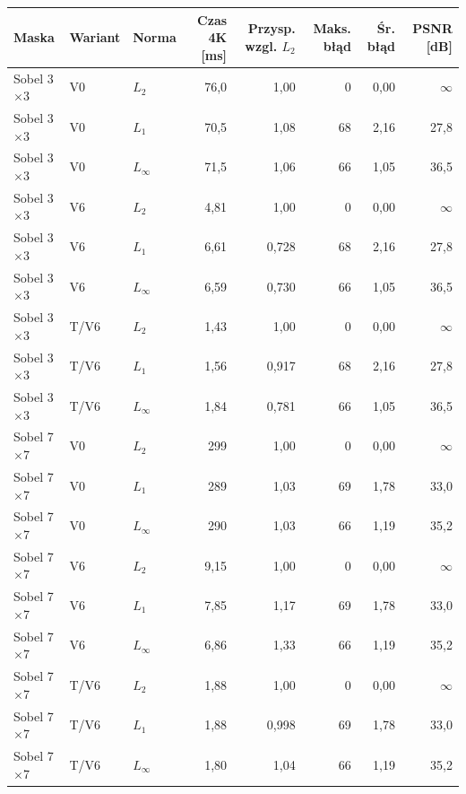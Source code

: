 \begin{tabular}{lllrrrrr}
\toprule
Maska & Wariant & Norma & Czas 4K [ms] & Przysp. wzgl. $L_2$ & Maks. błąd & Śr. błąd & PSNR [dB] \\
\midrule
Sobel 3$\times$3 & V0 & $L_2$ & 76,0 & 1,00 & 0 & 0,00 & $\infty$ \\
Sobel 3$\times$3 & V0 & $L_1$ & 70,5 & 1,08 & 68 & 2,16 & 27,8 \\
Sobel 3$\times$3 & V0 & $L_\infty$ & 71,5 & 1,06 & 66 & 1,05 & 36,5 \\
Sobel 3$\times$3 & V6 & $L_2$ & 4,81 & 1,00 & 0 & 0,00 & $\infty$ \\
Sobel 3$\times$3 & V6 & $L_1$ & 6,61 & 0,728 & 68 & 2,16 & 27,8 \\
Sobel 3$\times$3 & V6 & $L_\infty$ & 6,59 & 0,730 & 66 & 1,05 & 36,5 \\
Sobel 3$\times$3 & T/V6 & $L_2$ & 1,43 & 1,00 & 0 & 0,00 & $\infty$ \\
Sobel 3$\times$3 & T/V6 & $L_1$ & 1,56 & 0,917 & 68 & 2,16 & 27,8 \\
Sobel 3$\times$3 & T/V6 & $L_\infty$ & 1,84 & 0,781 & 66 & 1,05 & 36,5 \\
Sobel 7$\times$7 & V0 & $L_2$ & 299 & 1,00 & 0 & 0,00 & $\infty$ \\
Sobel 7$\times$7 & V0 & $L_1$ & 289 & 1,03 & 69 & 1,78 & 33,0 \\
Sobel 7$\times$7 & V0 & $L_\infty$ & 290 & 1,03 & 66 & 1,19 & 35,2 \\
Sobel 7$\times$7 & V6 & $L_2$ & 9,15 & 1,00 & 0 & 0,00 & $\infty$ \\
Sobel 7$\times$7 & V6 & $L_1$ & 7,85 & 1,17 & 69 & 1,78 & 33,0 \\
Sobel 7$\times$7 & V6 & $L_\infty$ & 6,86 & 1,33 & 66 & 1,19 & 35,2 \\
Sobel 7$\times$7 & T/V6 & $L_2$ & 1,88 & 1,00 & 0 & 0,00 & $\infty$ \\
Sobel 7$\times$7 & T/V6 & $L_1$ & 1,88 & 0,998 & 69 & 1,78 & 33,0 \\
Sobel 7$\times$7 & T/V6 & $L_\infty$ & 1,80 & 1,04 & 66 & 1,19 & 35,2 \\
\bottomrule
\end{tabular}
